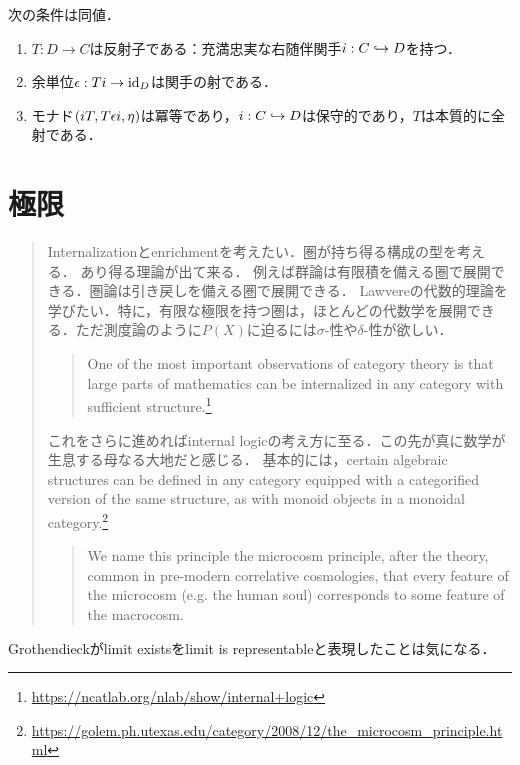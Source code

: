 \documentclass[uplatex,dvipdfmx]{jsreport}
\begin{document}
\begin{lemma}[反射子の特徴付け]\label{lemma-characterization-of-reflector}
    次の条件は同値．
    \begin{enumerate}
        \item $T:D\to C$は反射子である：充満忠実な右随伴関手$i:C\hookrightarrow D$を持つ．
        \item 余単位$\epsilon:Ti\to \mathrm{id}_D$は関手の射である．
        \item モナド$(iT,T\epsilon i,\eta)$は冪等であり，$i:C\hookrightarrow D$は保守的であり，$T$は本質的に全射である．
    \end{enumerate}
\end{lemma}

\chapter{極限}

\begin{quotation}
    Internalizationとenrichmentを考えたい．圏が持ち得る構成の型を考える．
    あり得る理論が出て来る．
    例えば群論は有限積を備える圏で展開できる．圏論は引き戻しを備える圏で展開できる．
    Lawvereの代数的理論を学びたい．特に，有限な極限を持つ圏は，ほとんどの代数学を展開できる．ただ測度論のように$P(X)$に迫るには$\sigma$-性や$\delta$-性が欲しい．
    \begin{quote}
        One of the most important observations of category theory is that large parts of mathematics can be internalized in any category with sufficient structure.\footnote{\url{https://ncatlab.org/nlab/show/internal+logic}}
    \end{quote}
    これをさらに進めればinternal logicの考え方に至る．この先が真に数学が生息する母なる大地だと感じる．
    基本的には，certain algebraic structures can be defined in any category equipped with a categorified version of the same structure, as with monoid objects in a monoidal category.\footnote{\url{https://golem.ph.utexas.edu/category/2008/12/the_microcosm_principle.html}}
    \begin{quote}
        We name this principle the microcosm principle, after the theory, common in pre-modern correlative cosmologies, that every feature of the microcosm (e.g. the human soul) corresponds to some feature of the macrocosm.\cite{John and James}
    \end{quote}
\end{quotation}

\begin{tcolorbox}[colframe=ForestGreen, colback=ForestGreen!10!white, breakable ,colbacktitle=ForestGreen!40!white, coltitle=black,fonttitle=\bfseries\sffamily,
    title=]
    Grothendieckがlimit existsをlimit is representableと表現したことは気になる．
\end{tcolorbox}
\end{document}
